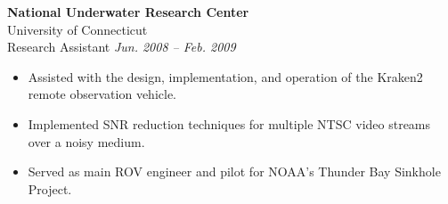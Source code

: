 \documentclass{article}
\begin{document}
{\begin{multicols}{2}
    \columnbreak
    \textbf{National Underwater Research Center}\\ \hfill 
	University of Connecticut\\ 
	Research Assistant \hfill \textsl{Jun. 2008 -- Feb. 2009} \\
    \vspace{ -10px}
    \begin{itemize}[noitemsep,nolistsep]
	\item Assisted with the design, implementation, and operation of the Kraken2 remote observation vehicle.
	\item Implemented SNR reduction techniques for multiple NTSC video streams over a noisy medium.
	\item Served as main ROV engineer and pilot for NOAA's Thunder Bay Sinkhole Project. 
    \end{itemize}
    \vspace{5px}

\end{multicols}}
\end{document}

